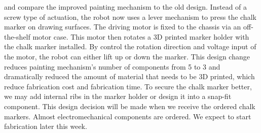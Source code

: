  and  compare the improved painting mechanism to the old design. Instead of a screw type of actuation, the robot now uses a lever mechanism to press the chalk marker on drawing surfaces. The driving motor is fixed to the chassis via an off-the-shelf motor case. This motor then rotates a 3D printed marker holder with the chalk marker installed. By control the rotation direction and voltage input of the motor, the robot can either lift up or down the marker. This design change reduces painting mechanism’s number of components from 5 to 3 and dramatically reduced the amount of material that needs to be 3D printed, which reduce fabrication cost and fabrication time. To secure the chalk marker better, we may add internal ribs in the marker holder or design it into a snap-fit component. This design decision will be made when we receive the ordered chalk markers. Almost electromechanical components are ordered. We expect to start fabrication later this week. 

